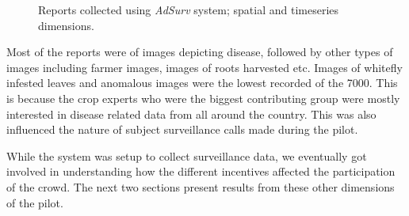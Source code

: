 \documentclass[letterpaper]{article} %
\begin{document}
\begin{figure}[!h]
  \centering
    \caption{Reports collected using \emph{AdSurv} system; spatial and timeseries dimensions.}
    \label{reports}
\end{figure}







Most of the reports were of images depicting disease, followed by other types of images including farmer images, images of roots harvested etc. Images of whitefly infested leaves and anomalous images were the lowest recorded of the 7000. This is because the crop experts who were the biggest contributing group were mostly interested in disease related data from all around the country. This was also influenced the nature of subject surveillance calls made during the pilot.

While the system was setup to collect surveillance data, we eventually got involved in understanding how the different incentives affected the participation of the crowd. The next two sections present results from these other dimensions of the pilot.
\end{document}

